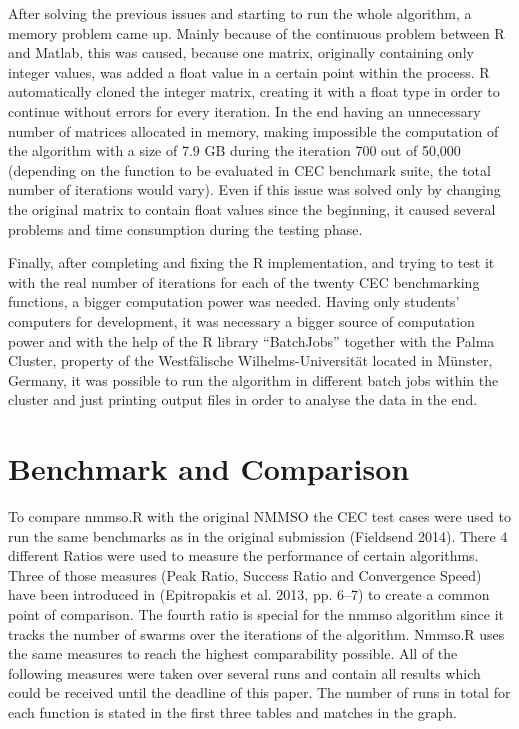 \documentclass[12pt,a4paper]{article}
\begin{document}
After solving the previous issues and starting to run the whole
algorithm, a memory problem came up. Mainly because of the continuous
problem between R and Matlab, this was caused, because one matrix,
originally containing only integer values, was added a float value in a
certain point within the process. R automatically cloned the integer
matrix, creating it with a float type in order to continue without
errors for every iteration. In the end having an unnecessary number of
matrices allocated in memory, making impossible the computation of the
algorithm with a size of 7.9 GB during the iteration 700 out of 50,000
(depending on the function to be evaluated in CEC benchmark suite, the
total number of iterations would vary). Even if this issue was solved
only by changing the original matrix to contain float values since the
beginning, it caused several problems and time consumption during the
testing phase.

Finally, after completing and fixing the R implementation, and trying to
test it with the real number of iterations for each of the twenty CEC
benchmarking functions, a bigger computation power was needed. Having
only students' computers for development, it was necessary a bigger
source of computation power and with the help of the R library
``BatchJobs'' together with the Palma Cluster, property of the
Westfälische Wilhelms-Universität located in Münster, Germany, it was
possible to run the algorithm in different batch jobs within the cluster
and just printing output files in order to analyse the data in the end.

\section{Benchmark and Comparison}\label{benchmark-and-comparison}

To compare nmmso.R with the original NMMSO the CEC test cases were used
to run the same benchmarks as in the original submission (Fieldsend
2014). There 4 different Ratios were used to measure the performance of
certain algorithms. Three of those measures (Peak Ratio, Success Ratio
and Convergence Speed) have been introduced in (Epitropakis et al. 2013,
pp. 6--7) to create a common point of comparison. The fourth ratio is
special for the nmmso algorithm since it tracks the number of swarms
over the iterations of the algorithm. Nmmso.R uses the same measures to
reach the highest comparability possible. All of the following measures
were taken over several runs and contain all results which could be
received until the deadline of this paper. The number of runs in total
for each function is stated in the first three tables and matches in the
graph.
\end{document}
